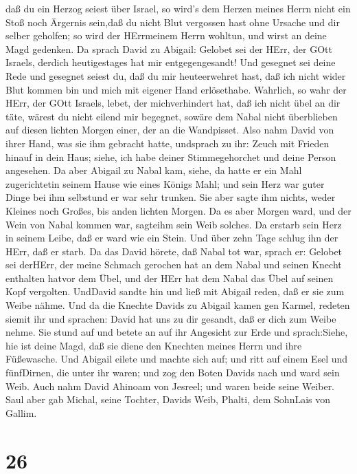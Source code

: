 daß du ein Herzog seiest über Israel,  so wird's dem Herzen
meines Herrn nicht ein Stoß noch Ärgernis sein,daß du nicht Blut
vergossen hast ohne Ursache und dir selber geholfen; so wird der
HErrmeinem Herrn wohltun, und wirst an deine Magd gedenken.
 Da sprach David zu Abigail: Gelobet sei der HErr, der GOtt
Israels, derdich heutigestages hat mir entgegengesandt! 
Und gesegnet sei deine Rede und gesegnet seiest du, daß du mir
heuteerwehret hast, daß ich nicht wider Blut kommen bin und mich mit
eigener Hand erlösethabe.  Wahrlich, so wahr der HErr, der
GOtt Israels, lebet, der michverhindert hat, daß ich nicht übel an dir
täte, wärest du nicht eilend mir begegnet, sowäre dem Nabal nicht
überblieben auf diesen lichten Morgen einer, der an die Wandpisset.
 Also nahm David von ihrer Hand, was sie ihm gebracht
hatte, undsprach zu ihr: Zeuch mit Frieden hinauf in dein Haus; siehe,
ich habe deiner Stimmegehorchet und deine Person angesehen.
 Da aber Abigail zu Nabal kam, siehe, da hatte er ein Mahl
zugerichtetin seinem Hause wie eines Königs Mahl; und sein Herz war
guter Dinge bei ihm selbstund er war sehr trunken. Sie aber sagte ihm
nichts, weder Kleines noch Großes, bis anden lichten Morgen.
 Da es aber Morgen ward, und der Wein von Nabal kommen war,
sagteihm sein Weib solches. Da erstarb sein Herz in seinem Leibe, daß er
ward wie ein Stein.  Und über zehn Tage schlug ihn der
HErr, daß er starb.  Da das David hörete, daß Nabal tot
war, sprach er: Gelobet sei derHErr, der meine Schmach gerochen hat an
dem Nabal und seinen Knecht enthalten hatvor dem Übel, und der HErr hat
dem Nabal das Übel auf seinen Kopf vergolten. UndDavid sandte hin und
ließ mit Abigail reden, daß er sie zum Weibe nähme.  Und da
die Knechte Davids zu Abigail kamen gen Karmel, redeten siemit ihr und
sprachen: David hat uns zu dir gesandt, daß er dich zum Weibe nehme.
 Sie stund auf und betete an auf ihr Angesicht zur Erde und
sprach:Siehe, hie ist deine Magd, daß sie diene den Knechten meines
Herrn und ihre Füßewasche.  Und Abigail eilete und machte
sich auf; und ritt auf einem Esel und fünfDirnen, die unter ihr waren;
und zog den Boten Davids nach und ward sein Weib.  Auch
nahm David Ahinoam von Jesreel; und waren beide seine Weiber.
 Saul aber gab Michal, seine Tochter, Davids Weib, Phalti,
dem SohnLais von Gallim.

\hypertarget{section-25}{%
\section{26}\label{section-25}}

